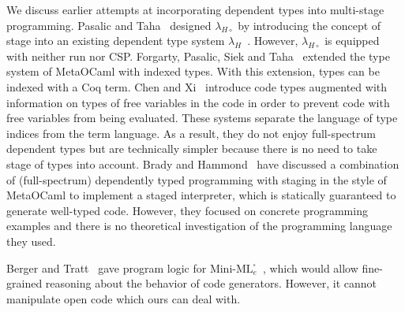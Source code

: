 
We discuss earlier attempts at incorporating dependent types into
multi-stage programming.  Pasalic and Taha~\cite{pasalic2002tagless}
designed \(\lambda_{H\circ}\) by introducing the concept of stage into
an existing dependent type system
\(\lambda_H\)~\cite{zhong2002certified}.  However,
\(\lambda_{H\circ}\) is equipped with neither run nor CSP.  Forgarty,
Pasalic, Siek and Taha~\cite{fogarty2007concoqtion} extended the type
system of MetaOCaml with indexed types.  With this extension, types
can be indexed with a Coq term.  Chen and Xi~\cite{chen2003meta}
introduce code types augmented with information on types of free
variables in the code in order to prevent code with free variables
from being evaluated.  These systems separate the language of type
indices from the term language.  As a result, they do not enjoy
full-spectrum dependent types but are technically simpler because
there is no need to take stage of types into account.  Brady and
Hammond~\cite{brady2006dependently} have discussed a combination of
(full-spectrum) dependently typed programming with staging in the
style of MetaOCaml to implement a staged interpreter, which is
statically guaranteed to generate well-typed code.  However, they
focused on concrete programming examples and there is no theoretical
investigation of the programming language they used.

Berger and Tratt~\cite{martin2015HGRTMP} gave program logic for
\(\text{Mini-ML}^\square_e\)~\cite{DaviesPfenning01JACM}, which would
allow fine-grained reasoning about the behavior of code generators.
However, it cannot manipulate open code which ours can deal with.


